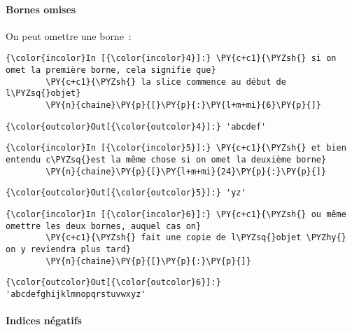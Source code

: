     \hypertarget{bornes-omises}{%
\paragraph{Bornes omises}\label{bornes-omises}}

    On peut omettre une borne~:

    \begin{Verbatim}[commandchars=\\\{\}]
{\color{incolor}In [{\color{incolor}4}]:} \PY{c+c1}{\PYZsh{} si on omet la première borne, cela signifie que}
        \PY{c+c1}{\PYZsh{} la slice commence au début de l\PYZsq{}objet}
        \PY{n}{chaine}\PY{p}{[}\PY{p}{:}\PY{l+m+mi}{6}\PY{p}{]}
\end{Verbatim}


\begin{Verbatim}[commandchars=\\\{\}]
{\color{outcolor}Out[{\color{outcolor}4}]:} 'abcdef'
\end{Verbatim}
            
    \begin{Verbatim}[commandchars=\\\{\}]
{\color{incolor}In [{\color{incolor}5}]:} \PY{c+c1}{\PYZsh{} et bien entendu c\PYZsq{}est la même chose si on omet la deuxième borne}
        \PY{n}{chaine}\PY{p}{[}\PY{l+m+mi}{24}\PY{p}{:}\PY{p}{]}
\end{Verbatim}


\begin{Verbatim}[commandchars=\\\{\}]
{\color{outcolor}Out[{\color{outcolor}5}]:} 'yz'
\end{Verbatim}
            
    \begin{Verbatim}[commandchars=\\\{\}]
{\color{incolor}In [{\color{incolor}6}]:} \PY{c+c1}{\PYZsh{} ou même omettre les deux bornes, auquel cas on}
        \PY{c+c1}{\PYZsh{} fait une copie de l\PYZsq{}objet \PYZhy{} on y reviendra plus tard}
        \PY{n}{chaine}\PY{p}{[}\PY{p}{:}\PY{p}{]}
\end{Verbatim}


\begin{Verbatim}[commandchars=\\\{\}]
{\color{outcolor}Out[{\color{outcolor}6}]:} 'abcdefghijklmnopqrstuvwxyz'
\end{Verbatim}
            
    \hypertarget{indices-nuxe9gatifs}{%
\paragraph{Indices négatifs}\label{indices-nuxe9gatifs}}

